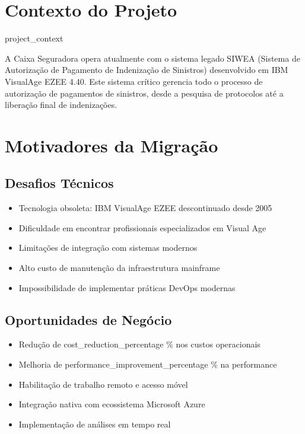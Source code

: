 
\section{Contexto do Projeto}

{{ project_context }}

A Caixa Seguradora opera atualmente com o sistema legado SIWEA (Sistema de Autorização de Pagamento de Indenização de Sinistros) desenvolvido em IBM VisualAge EZEE 4.40. Este sistema crítico gerencia todo o processo de autorização de pagamentos de sinistros, desde a pesquisa de protocolos até a liberação final de indenizações.

\section{Motivadores da Migração}

\subsection{Desafios Técnicos}
\begin{itemize}
    \item Tecnologia obsoleta: IBM VisualAge EZEE descontinuado desde 2005
    \item Dificuldade em encontrar profissionais especializados em Visual Age
    \item Limitações de integração com sistemas modernos
    \item Alto custo de manutenção da infraestrutura mainframe
    \item Impossibilidade de implementar práticas DevOps modernas
\end{itemize}

\subsection{Oportunidades de Negócio}
\begin{itemize}
    \item Redução de {{ cost_reduction_percentage }}\% nos custos operacionais
    \item Melhoria de {{ performance_improvement_percentage }}\% na performance
    \item Habilitação de trabalho remoto e acesso móvel
    \item Integração nativa com ecossistema Microsoft Azure
    \item Implementação de análises em tempo real
\end{itemize}

